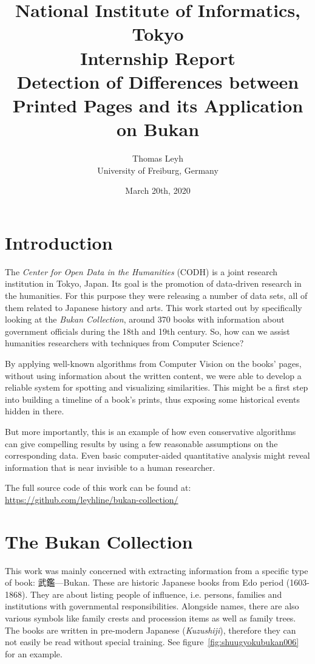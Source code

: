 \documentclass{ltjarticle}
\title{\large National Institute of Informatics, Tokyo \\ Internship Report \\ \LARGE Detection of Differences between Printed Pages and its Application on Bukan}
\author{Thomas Leyh \\ University of Freiburg, Germany}
\date{March 20th, 2020}
\begin{document}
\clearpage\maketitle
\thispagestyle{empty}

\tableofcontents

\pagebreak
\setcounter{page}{1}

\section{Introduction}

The \emph{Center for Open Data in the Humanities} (CODH) is a joint research institution in Tokyo, Japan. Its goal is the promotion of data-driven research in the humanities.\cite{kitamoto2017codh} For this purpose they were releasing a number of data sets, all of them related to Japanese history and arts. This work started out by specifically looking at the \emph{Bukan Collection}\cite{codh2018bukan}, around 370 books with information about government officials during the 18th and 19th century. So, how can we assist humanities researchers with techniques from Computer Science?

By applying well-known algorithms from Computer Vision on the books' pages, without using information about the written content, we were able to develop a reliable system for spotting and visualizing similarities. This might be a first step into building a timeline of a book's prints, thus exposing some historical events hidden in there.

But more importantly, this is an example of how even conservative algorithms can give compelling results by using a few reasonable assumptions on the corresponding data. Even basic computer-aided quantitative analysis might reveal information that is near invisible to a human researcher.

The full source code of this work can be found at: \url{https://github.com/leyhline/bukan-collection/}

\section{The Bukan Collection}

This work was mainly concerned with extracting information from a specific type of book: 武鑑---Bukan. These are historic Japanese books from Edo period (1603-1868). They are about listing people of influence, i.e. persons, families and institutions with governmental responsibilities. Alongside names, there are also various symbols like family crests and procession items as well as family trees. The books are written in pre-modern Japanese (\emph{Kuzushiji}), therefore they can not easily be read without special training.\cite{hakim2019} See figure~\ref{fig:shuugyokubukan006} for an example.
\end{document}
